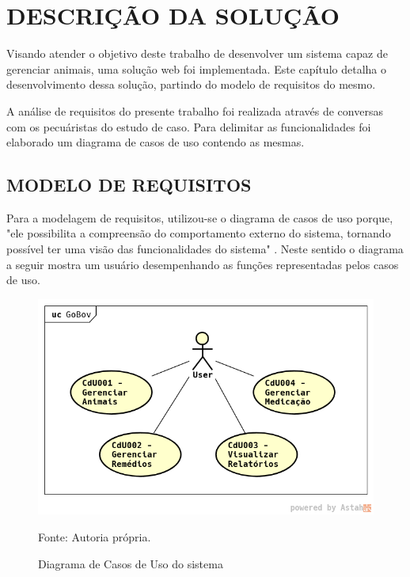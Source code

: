 %
%


\chapter{\textbf{DESCRIÇÃO DA SOLUÇÃO}}\label{chap:descSolucao}

Visando atender o objetivo deste trabalho de desenvolver um sistema capaz de gerenciar animais, uma solução web foi implementada. Este capítulo detalha o desenvolvimento dessa solução, partindo do modelo de requisitos do mesmo.

A análise de requisitos do presente trabalho foi realizada através de conversas com os pecuáristas do estudo de caso. Para delimitar as funcionalidades foi elaborado um diagrama de casos de uso contendo as mesmas.

\section{MODELO DE REQUISITOS}

Para a modelagem de requisitos, utilizou-se o diagrama de casos de uso porque, "ele possibilita a compreensão do comportamento externo do sistema, tornando possível ter uma visão das funcionalidades do sistema" \cite{guedes18}. Neste sentido o diagrama a seguir mostra um usuário desempenhando as funções representadas pelos casos de uso.

\begin{figure}[H]
	\begin{center}
		\caption{Diagrama de Casos de Uso do sistema}
		\includegraphics[width=\textwidth]{../img/casosdeuso.png}

		Fonte: Autoria própria.
	\end{center}
	\label{CdU}
\end{figure}

